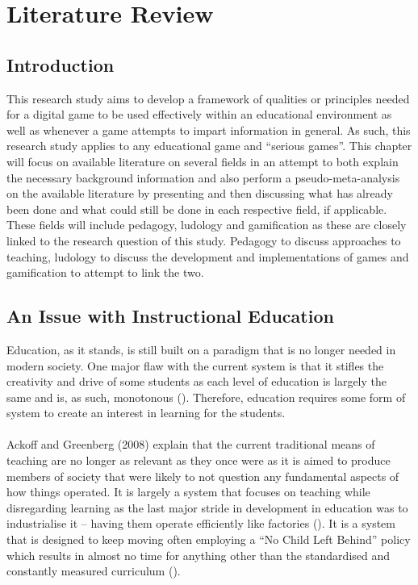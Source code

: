
\chapter{Literature Review} %

\label{Chapter2} %


\section{Introduction}
This research study aims to develop a framework of qualities or principles needed for a digital game to be used effectively within an educational environment as well as whenever a game attempts to impart information in general. As such, this research study applies to any educational game and “serious games”. This chapter will focus on available literature on several fields in an attempt to both explain the necessary background information and also perform a pseudo-meta-analysis on the available literature by presenting and then discussing what has already been done and what could still be done in each respective field, if applicable. These fields will include pedagogy, ludology and gamification as these are closely linked to the research question of this study. Pedagogy to discuss approaches to teaching, ludology to discuss the development and implementations of games and gamification to attempt to link the two.

\section{An Issue with Instructional Education}
Education, as it stands, is still built on a paradigm that is no longer needed in modern society. One major flaw with the current system is that it stifles the creativity and drive of some students as each level of education is largely the same and is, as such, monotonous (\cite{Ackoff2008}). Therefore, education requires some form of system to create an interest in learning for the students.
\\\\
Ackoff and Greenberg (2008) explain that the current traditional means of teaching are no longer as relevant as they once were as it is aimed to produce members of society that were likely to not question any fundamental aspects of how things operated. It is largely a system that focuses on teaching while disregarding learning as the last major stride in development in education was to industrialise it – having them operate efficiently like factories (\cite{Ackoff2008}). It is a system that is designed to keep moving often employing a “No Child Left Behind” policy which results in almost no time for anything other than the standardised and constantly measured curriculum (\cite{gibson2006games}). 


